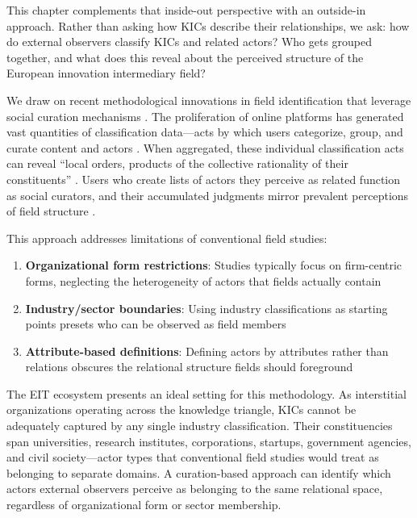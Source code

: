 \documentclass[../main.tex]{subfiles}
\begin{document}
This chapter complements that inside-out perspective with an outside-in approach. Rather than asking how KICs describe their relationships, we ask: how do external observers classify KICs and related actors? Who gets grouped together, and what does this reveal about the perceived structure of the European innovation intermediary field?

We draw on recent methodological innovations in field identification that leverage social curation mechanisms . The proliferation of online platforms has generated vast quantities of classification data---acts by which users categorize, group, and curate content and actors \cite{lazer2009computational}. When aggregated, these individual classification acts can reveal ``local orders, products of the collective rationality of their constituents'' \parencite{benabdelkrim-opening-fields-2020}. Users who create lists of actors they perceive as related function as social curators, and their accumulated judgments mirror prevalent perceptions of field structure \cite{bowker1999sorting}.

This approach addresses limitations of conventional field studies:

\begin{enumerate}
    \item \textbf{Organizational form restrictions}: Studies typically focus on firm-centric forms, neglecting the heterogeneity of actors that fields actually contain
    \item \textbf{Industry/sector boundaries}: Using industry classifications as starting points presets who can be observed as field members
    \item \textbf{Attribute-based definitions}: Defining actors by attributes rather than relations obscures the relational structure fields should foreground
\end{enumerate}

The EIT ecosystem presents an ideal setting for this methodology. As interstitial organizations operating across the knowledge triangle, KICs cannot be adequately captured by any single industry classification. Their constituencies span universities, research institutes, corporations, startups, government agencies, and civil society---actor types that conventional field studies would treat as belonging to separate domains. A curation-based approach can identify which actors external observers perceive as belonging to the same relational space, regardless of organizational form or sector membership.
\end{document}
